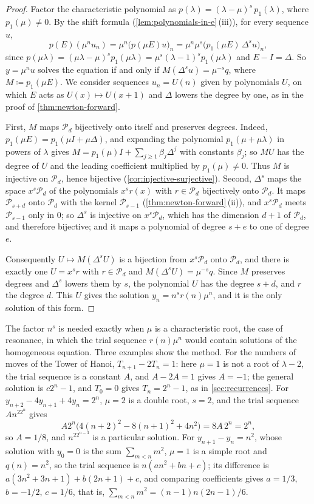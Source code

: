 \begin{proof}
Factor the characteristic polynomial as $p(\lambda)=(\lambda-\mu)^s\,p_1(\lambda)$, where $p_1(\mu)\ne0$. By the shift formula (\cref{lem:polynomials-in-e}\,(iii)), for every sequence $u$,
\[
p(E)(\mu^nu_n)=\mu^n\bigl(p(\mu E)u\bigr)_n=\mu^n\mu^s\bigl(p_1(\mu E)\,\Delta^su\bigr)_n ,
\]
since $p(\mu\lambda)=(\mu\lambda-\mu)^sp_1(\mu\lambda)=\mu^s(\lambda-1)^sp_1(\mu\lambda)$ and $E-I=\Delta$. So $y=\mu^nu$ solves the equation if and only if $M(\Delta^su)=\mu^{-s}q$, where $M\coloneqq p_1(\mu E)$. We consider sequences $u_n=U(n)$ given by polynomials $U$, on which $E$ acts as $U(x)\mapsto U(x+1)$ and $\Delta$ lowers the degree by one, as in the proof of \cref{thm:newton-forward}.

First, $M$ maps $\mathcal P_d$ bijectively onto itself and preserves degrees. Indeed, $p_1(\mu E)=p_1(\mu I+\mu\Delta)$, and expanding the polynomial $p_1(\mu+\mu\lambda)$ in powers of $\lambda$ gives $M=p_1(\mu)I+\sum_{j\ge1}\beta_j\Delta^j$ with constants $\beta_j$; so $MU$ has the degree of $U$ and the leading coefficient multiplied by $p_1(\mu)\ne0$. Thus $M$ is injective on $\mathcal P_d$, hence bijective (\cref{cor:injective-surjective}). Second, $\Delta^s$ maps the space $x^s\mathcal P_d$ of the polynomials $x^sr(x)$ with $r\in\mathcal P_d$ bijectively onto $\mathcal P_d$. It maps $\mathcal P_{s+d}$ onto $\mathcal P_d$ with the kernel $\mathcal P_{s-1}$ (\cref{thm:newton-forward}\,(ii)), and $x^s\mathcal P_d$ meets $\mathcal P_{s-1}$ only in $0$; so $\Delta^s$ is injective on $x^s\mathcal P_d$, which has the dimension $d+1$ of $\mathcal P_d$, and therefore bijective; and it maps a polynomial of degree $s+e$ to one of degree $e$.

Consequently $U\mapsto M(\Delta^sU)$ is a bijection from $x^s\mathcal P_d$ onto $\mathcal P_d$, and there is exactly one $U=x^sr$ with $r\in\mathcal P_d$ and $M(\Delta^sU)=\mu^{-s}q$. Since $M$ preserves degrees and $\Delta^s$ lowers them by $s$, the polynomial $U$ has the degree $s+d$, and $r$ the degree $d$. This $U$ gives the solution $y_n=n^sr(n)\mu^n$, and it is the only solution of this form.
\end{proof}

The factor $n^s$ is needed exactly when $\mu$ is a characteristic root, the case of resonance, in which the trial sequence $r(n)\mu^n$ would contain solutions of the homogeneous equation. Three examples show the method. For the numbers of moves of the Tower of Hanoi, $T_{n+1}-2T_n=1$: here $\mu=1$ is not a root of $\lambda-2$, the trial sequence is a constant $A$, and $A-2A=1$ gives $A=-1$; the general solution is $c2^n-1$, and $T_0=0$ gives $T_n=2^n-1$, as in \cref{sec:recurrences}. For $y_{n+2}-4y_{n+1}+4y_n=2^n$, $\mu=2$ is a double root, $s=2$, and the trial sequence $An^22^n$ gives
\[
A2^n\bigl(4(n+2)^2-8(n+1)^2+4n^2\bigr)=8A\,2^n=2^n ,
\]
so $A=1/8$, and $n^22^{n-3}$ is a particular solution. For $y_{n+1}-y_n=n^2$, whose solution with $y_0=0$ is the sum $\sum_{m<n}m^2$, $\mu=1$ is a simple root and $q(n)=n^2$, so the trial sequence is $n(an^2+bn+c)$; its difference is $a(3n^2+3n+1)+b(2n+1)+c$, and comparing coefficients gives $a=1/3$, $b=-1/2$, $c=1/6$, that is, $\sum_{m<n}m^2=(n-1)n(2n-1)/6$.

